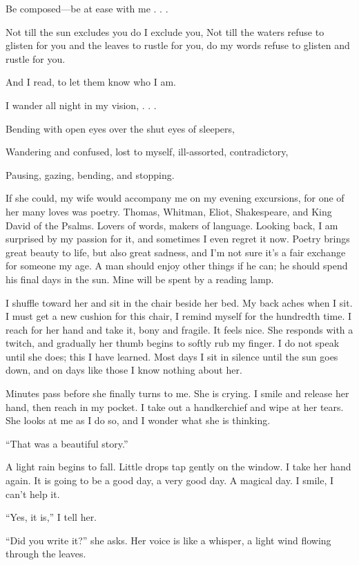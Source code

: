 \documentclass[10pt, twoside, openright]{book}
\begin{document}
Be composed---be at ease with me . . .

Not till the sun excludes you do I exclude you, Not till the waters
refuse to glisten for you and the leaves to rustle for you, do my words
refuse to glisten and rustle for you.

And I read, to let them know who I am.

I wander all night in my vision, . . .

Bending with open eyes over the shut eyes of sleepers,

Wandering and confused, lost to myself, ill-assorted, contradictory,

Pausing, gazing, bending, and stopping.


If she could, my wife would accompany me on my evening excursions, for
one of her many loves was poetry. Thomas, Whitman, Eliot, Shakespeare,
and King David of the Psalms. Lovers of words, makers of language.
Looking back, I am surprised by my passion for it, and sometimes I even
regret it now. Poetry brings great beauty to life, but also great
sadness, and I'm not sure it's a fair exchange for someone my age. A man
should enjoy other things if he can; he should spend his final days in
the sun. Mine will be spent by a reading lamp.

I shuffle toward her and sit in the chair beside her bed. My back aches
when I sit. I must get a new cushion for this chair, I remind myself for
the hundredth time. I reach for her hand and take it, bony and fragile.
It feels nice. She responds with a twitch, and gradually her thumb
begins to softly rub my finger. I do not speak until she does; this I
have learned. Most days I sit in silence until the sun goes down, and on
days like those I know nothing about her.

Minutes pass before she finally turns to me. She is crying. I smile and
release her hand, then reach in my pocket. I take out a handkerchief and
wipe at her tears. She looks at me as I do so, and I wonder what she is
thinking.


``That was a beautiful story.''


A light rain begins to fall. Little drops tap gently on the window. I
take her hand again. It is going to be a good day, a very good day. A
magical day. I smile, I can't help it.


``Yes, it is,'' I tell her.


``Did you write it?'' she asks. Her voice is like a whisper, a light
wind flowing through the leaves.
\end{document}
